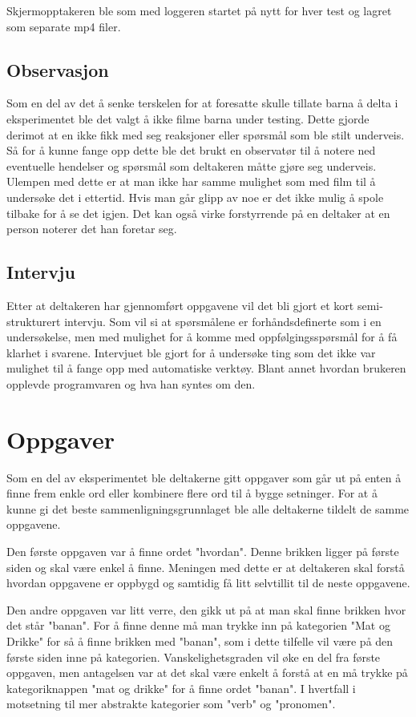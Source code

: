  
Skjermopptakeren ble som med loggeren startet på nytt for hver test og lagret som separate mp4 filer.  
 
 
\subsection{Observasjon} 
 
Som en del av det å senke terskelen for at foresatte skulle tillate barna å delta i eksperimentet ble det valgt å ikke filme barna under testing. Dette gjorde derimot at en ikke fikk med seg reaksjoner eller spørsmål som ble stilt underveis. Så for å kunne fange opp dette ble det brukt en observatør til å notere ned eventuelle hendelser og spørsmål som deltakeren måtte gjøre seg underveis. Ulempen med dette er at man ikke har samme mulighet som med film til å undersøke det i ettertid. Hvis man går glipp av noe er det ikke mulig å spole tilbake for å se det igjen. Det kan også virke forstyrrende på en deltaker at en person noterer det han foretar seg. 

 
\subsection{Intervju} 

Etter at deltakeren har gjennomført oppgavene vil det bli gjort et kort semi-strukturert intervju. Som vil si at spørsmålene er forhåndsdefinerte som i en undersøkelse, men med mulighet for å komme med oppfølgingsspørsmål for å få klarhet i svarene. Intervjuet ble gjort for å undersøke ting som det ikke var mulighet til å fange opp med automatiske verktøy. Blant annet hvordan brukeren opplevde programvaren og hva han syntes om den. 
 
\section{Oppgaver} 

Som en del av eksperimentet ble deltakerne gitt oppgaver som går ut på enten å finne frem enkle ord eller kombinere flere ord til å bygge setninger. For at å kunne gi det beste sammenligningsgrunnlaget ble alle deltakerne tildelt de samme oppgavene. 
 
 
Den første oppgaven var å finne ordet "hvordan". Denne brikken ligger på første siden og skal være enkel å finne. Meningen med dette er at deltakeren skal forstå hvordan oppgavene er oppbygd og samtidig få litt selvtillit til de neste oppgavene. 
 
 
Den andre oppgaven var litt verre, den gikk ut på at man skal finne brikken hvor det står "banan". For å finne denne må man trykke inn på kategorien "Mat og Drikke" for så å finne brikken med "banan", som i dette tilfelle vil være på den første siden inne på kategorien. Vanskelighetsgraden vil øke en del fra første oppgaven, men antagelsen var at det skal være enkelt å forstå at en må trykke på kategoriknappen "mat og drikke" for å finne ordet "banan". I hvertfall i motsetning til mer abstrakte kategorier som "verb" og "pronomen". 
 
